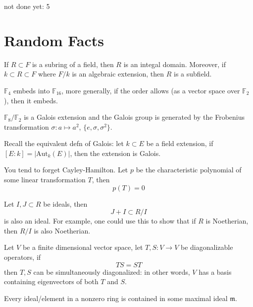 \documentclass[openany]{book}
\newcommand{\F}{\mathbb{F}}
\begin{document}
not done yet: 5





\chapter{Random Facts}

\begin{prop}
    If $R\subset F$ is a subring of a field, then $R$ is an integal domain. Moreover, if $k\subset R\subset F$ where $F/k$ is an algebraic extension, then $R$ is a subfield.
\end{prop}

\begin{prop}
    $\F_4$ embeds into $\F_{16}$, more generally, if the order allows (as a vector space over $\F_2$), then it embeds.
\end{prop}

\begin{prop}
    $\F_8/\F_2$ is a Galois extension and the Galois group is generated by the Frobenius transformation $\sigma: a\mapsto a^2$, $\{e, \sigma, \sigma^2\}$.

    Recall the equivalent defn of Galois: let $k\subset E$ be a field extension, if $[E: k]=|\text{Aut}_k(E)|$, then the extension is Galois.
\end{prop}

\begin{prop}
    You tend to forget Cayley-Hamilton. Let $p$ be the characteristic polynomial of some linear transformation $T$, then 
    \begin{equation*}
        p(T)=0
    \end{equation*}
\end{prop}


\begin{prop}
    Let $I,J\subset R$ be ideals, then 
    \begin{equation*}
        J+I\subset R/I
    \end{equation*}
    is also an ideal. For example, one could use this to show that if $R$ is Noetherian, then $R/I$ is also Noetherian.
\end{prop}


\begin{prop}
    Let $V$ be a finite dimensional vector space, let $T,S: V\to V$ be diagonalizable operators, if 
    \begin{equation*}
        TS=ST
    \end{equation*}
    then $T,S$ can be simultaneously diagonalized: in other words, $V$ has a basis containing eigenvectors of both $T$ and $S$.
\end{prop}


\begin{prop}
    Every ideal/element in a nonzero ring is contained in some maximal ideal $\mathfrak{m}$.
\end{prop}
\end{document}
